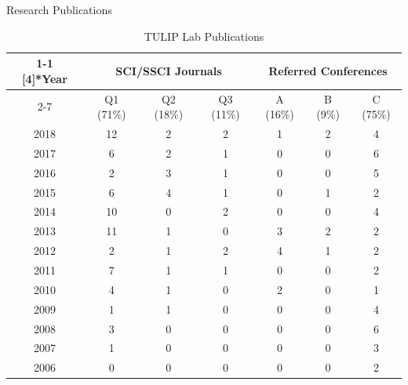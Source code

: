 \begin{slide}{Research Publications}
{\vspace{1cm}
\begin{table}
\setlength{\abovecaptionskip}{-25pt}
\setlength{\belowcaptionskip}{12pt}
\caption{TULIP Lab Publications}
\fontsize{13pt}{14pt}\selectfont
    \begin{tabular}{c|c c c|c c c}
    \toprule
\cmidrule{1-1}    \multirow{2}[4]{*}{Year} & \multicolumn{3}{c|}{SCI/SSCI Journals} &
\multicolumn{3}{c}{Referred Conferences} \\
\cmidrule{2-7}          & Q1 (71\%) & Q2 (18\%) & Q3 (11\%) & A (16\%) & B (9\%) & C (75\%) \\
    \midrule
    2018  & 12    & 2     & 2     & 1     & 2     & 4 \\
    2017  & 6     & 2     & 1     & 0     & 0     & 6 \\
    2016  & 2     & 3     & 1     & 0     & 0     & 5 \\
    2015  & 6     & 4     & 1     & 0     & 1     & 2 \\
    2014  & 10    & 0     & 2     & 0     & 0     & 4 \\
    2013  & 11    & 1     & 0     & 3     & 2     & 2 \\
    2012  & 2     & 1     & 2     & 4     & 1     & 2 \\
    2011  & 7     & 1     & 1     & 0     & 0     & 2 \\
    2010  & 4     & 1     & 0     & 2     & 0     & 1 \\
    2009  & 1     & 1     & 0     & 0     & 0     & 4 \\
    2008  & 3     & 0     & 0     & 0     & 0     & 6 \\
    2007  & 1     & 0     & 0     & 0     & 0     & 3 \\
    2006  & 0     & 0     & 0     & 0     & 0     & 2 \\
    \bottomrule
    \end{tabular}
\end{table}
}

{\vspace{0.1cm}
\begin{center}
\end{center}}
\end{slide}

